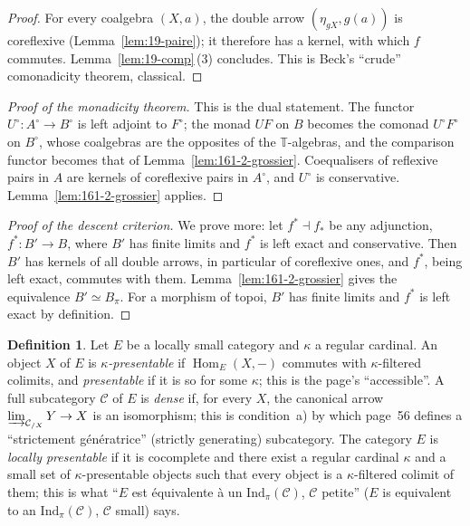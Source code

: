 \documentclass[11pt]{article}
\newcommand{\q}[1]{“#1”}
\theoremstyle{plain}
\theoremstyle{definition}
\newtheorem*{definition}{Definition}
\theoremstyle{remark}
\begin{document}
\begin{proof}
For every coalgebra $(X, a)$, the double arrow $(\eta_{gX}, g(a))$ is coreflexive (Lemma~\ref{lem:19-paire}); it therefore has a kernel, with which $f$ commutes. Lemma~\ref{lem:19-comp}\,(3) concludes. This is Beck's \q{crude} comonadicity theorem, classical.
\end{proof}

\begin{proof}[Proof of the monadicity theorem]
This is the dual statement. The functor $U^\circ : A^\circ \to B^\circ$ is left adjoint to $F^\circ$; the monad $UF$ on $B$ becomes the comonad $U^\circ F^\circ$ on $B^\circ$, whose coalgebras are the opposites of the $\mathbb T$-algebras, and the comparison functor becomes that of Lemma~\ref{lem:161-2-grossier}. Coequalisers of reflexive pairs in $A$ are kernels of coreflexive pairs in $A^\circ$, and $U^\circ$ is conservative. Lemma~\ref{lem:161-2-grossier} applies.
\end{proof}

\begin{proof}[Proof of the descent criterion]
We prove more: let $f^* \dashv f_*$ be any adjunction, $f^* : B' \to B$, where $B'$ has finite limits and $f^*$ is left exact and conservative. Then $B'$ has kernels of all double arrows, in particular of coreflexive ones, and $f^*$, being left exact, commutes with them. Lemma~\ref{lem:161-2-grossier} gives the equivalence $B' \simeq B_\pi$. For a morphism of topoi, $B'$ has finite limits and $f^*$ is left exact by definition.
\end{proof}

\begin{definition}
Let $E$ be a locally small category and $\kappa$ a regular cardinal. An object $X$ of $E$ is \emph{$\kappa$-presentable} if $\operatorname{Hom}_E(X, -)$ commutes with $\kappa$-filtered colimits, and \emph{presentable} if it is so for some $\kappa$; this is the page's \q{accessible}. A full subcategory $\mathcal C$ of $E$ is \emph{dense} if, for every $X$, the canonical arrow $\varinjlim_{\mathcal C_{/X}} Y \to X$ is an isomorphism; this is condition~a) by which page~56 defines a \q{strictement génératrice} (strictly generating) subcategory. The category $E$ is \emph{locally presentable} if it is cocomplete and there exist a regular cardinal $\kappa$ and a small set of $\kappa$-presentable objects such that every object is a $\kappa$-filtered colimit of them; this is what \q{$E$ est équivalente à un $\mathrm{Ind}_\pi(\mathcal C)$, $\mathcal C$ petite} ($E$ is equivalent to an $\mathrm{Ind}_\pi(\mathcal C)$, $\mathcal C$ small) says.
\end{definition}
\end{document}
